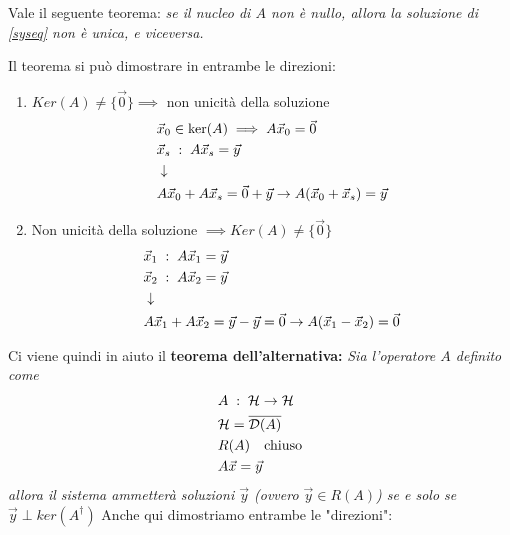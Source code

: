 Vale il seguente teorema: \textit{se il nucleo di $A$ non è nullo, allora la soluzione di \ref{syseq} non è unica, e viceversa.}

Il teorema si può dimostrare in entrambe le direzioni:
\begin{enumerate}
	\item $Ker(A) \neq \{\vec{0}\} \implies$ non unicità della soluzione
	\begin{align}
		&\vec{x}_0 \in \ker(A) \implies A \vec{x}_0 =  \vec{0}\\
		&\vec{x}_s \; : \; A \vec{x}_s = \vec{y} \\ &\downarrow \nonumber \\
		& A \vec{x}_0 + A \vec{x}_s =  \vec{0} + \vec{y} \to A(\vec{x}_0 + \vec{x}_s) = \vec{y} 
	\end{align}
	\item Non unicità della soluzione $\implies Ker(A) \neq \{\vec{0}\}$
	\begin{align}
		&\vec{x}_1 \; : \; A \vec{x}_1 = \vec{y} \\
		&\vec{x}_2 \; : \; A \vec{x}_2 = \vec{y} \\ &\downarrow \nonumber \\
		& A \vec{x}_1 + A \vec{x}_2 =  \vec{y} - \vec{y} = \vec{0} \to A(\vec{x}_1 - \vec{x}_2) = \vec{0} 
	\end{align}
\end{enumerate}
Ci viene quindi in aiuto il \textbf{teorema dell'alternativa:} \textit{Sia l'operatore $A$ definito come
	\begin{align}
		&A \; : \; \mathcal{H} \to \mathcal{H}\\
		&\mathcal{H} = \overline{\mathcal{D}(A)}\\
		&R(A) \quad \text{chiuso}\\
		&A \vec{x} = \vec{y} 
	\end{align}	
	allora il sistema ammetterà soluzioni $\vec{y}$ (ovvero $\vec{y} \in R(A)$) se e solo se $\vec{y} \perp ker(A^\dagger)$
}
Anche qui dimostriamo entrambe le "direzioni":
